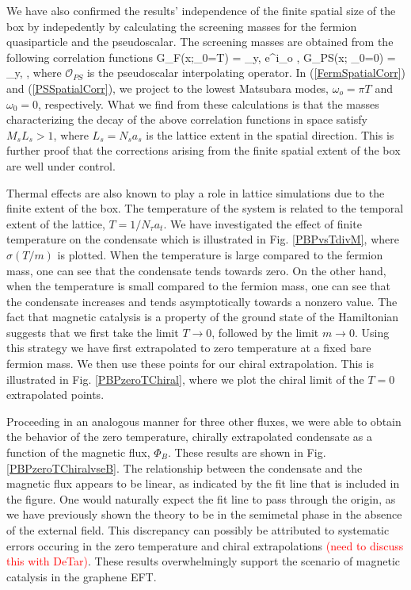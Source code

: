 \documentclass[aps,prd,twocolumn,showpacs,superscriptaddress,groupedaddress]{revtex4}  %
\begin{document}
We have also confirmed the results' independence of the finite spatial size of the box by indepedently by calculating the screening
masses for the fermion quasiparticle and the pseudoscalar. The screening masses are obtained from the following correlation functions
\beq
\label{FermSpatialCorr}
G_F(x;\omega_0=\pi T) = \sum_{y,\tau} e^{i\omega_o \tau} , 
\eeq
\beq
\label{PSSpatialCorr}
G_{PS}(x; \omega_0=0) = \sum_{y,\tau} ,
\eeq
where $\mathcal{O}_{PS}$ is the pseudoscalar interpolating operator.  In (\ref{FermSpatialCorr}) and (\ref{PSSpatialCorr}), we project to the lowest Matsubara modes, $\omega_o = \pi T$ and $\omega_0 = 0$, respectively.
What we find from these calculations is that the masses characterizing the decay of the above correlation functions in space satisfy $M_s L_s > 1$, where $L_s = N_s a_s$ is the  lattice extent in the spatial direction. This is further proof that the corrections arising from the finite spatial extent of the box 
are well under control.
 
Thermal effects are also known to play a role in lattice simulations due to the finite extent of the box. The temperature of the system is related to the temporal extent of the lattice, $T = 1/N_{\tau}a_t$. We have investigated the effect of finite temperature on the condensate which is illustrated in Fig. \ref{PBPvsTdivM}, where $\sigma(T/m)$ is plotted. When the temperature is large 
compared to the fermion mass, one can see that the condensate tends towards zero. On the other hand, when the temperature is small compared to the fermion mass, one can see that the condensate increases and tends asymptotically towards a nonzero value. The fact that magnetic catalysis is a property of the ground state of the Hamiltonian suggests that we first take the limit $T \to 0$, followed
by the limit $m \to 0$. Using this strategy we have first extrapolated to zero temperature at a fixed bare fermion mass. We then use these points for our chiral extrapolation. This is illustrated in Fig. \ref{PBPzeroTChiral}, where we plot the chiral limit of the $T=0$ extrapolated points.

Proceeding in an analogous manner for three other fluxes, we were able to obtain the behavior of the zero temperature, chirally extrapolated condensate as a function of the magnetic flux, $\Phi_B$. These results are shown in Fig. \ref{PBPzeroTChiralvseB}.
The relationship between the condensate and the magnetic flux appears to be linear, as indicated by the fit line that is included in the figure. One would naturally expect the fit line to pass through the origin, as we have previously shown the theory to be in the semimetal phase in the absence of the external field.
This discrepancy can possibly be attributed to systematic errors occuring in the zero temperature and chiral extrapolations \textcolor{red}{(need to discuss this with DeTar)}. These results overwhelmingly support the scenario of magnetic catalysis in the graphene EFT.
\end{document}
